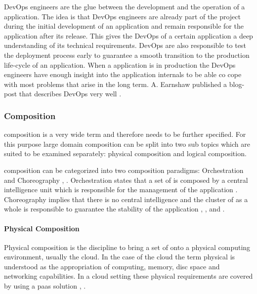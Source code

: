 DevOps engineers are the glue between the development and the operation of a
\ms{} application. The idea is that DevOps engineers are already part of the
project during the initial development of an application and remain responsible
for the application after its release. This gives the DevOps of a certain
application a deep understanding of its technical requirements. DevOps are also
responsible to test the deployment process early to guarantee a smooth
transition to the production life-cycle of an application. When a \ms{}
application is in production the DevOps engineers have enough insight into the
application internals to be able co cope with most problems that arise in the
long term. A. Earnshaw published a blog-post that describes DevOps very
well \cite{earnshaw2013devops}.

\subsubsection{\msuc{} Composition}
\label{subsub:composition}

\msuc{} composition is a very wide term and therefore needs to be further
specified. For this purpose large domain composition can be split into two sub
topics which are suited to be examined separately: physical composition and
logical composition.

\msuc{} composition can be categorized into two composition paradigms:
Orchestration and Choreography \cite{varjoinen2014orchestrationVSchoreography},
\cite{lublinsky2008orchestrationVSchoreography}. Orchestration states that a set
of \mss{} is composed by a central intelligence unit which is responsible for
the management of the application \cite{cohen2015orchestration}. Choreography
implies that there is no central intelligence and the cluster of \mss{} as a
whole is responsible to guarantee the stability of the application
\cite{millidge2015choreography}, \cite{vilas2016choreography}, and
\cite{jellema2017choreography}.

\paragraph{Physical Composition}

Physical composition is the discipline to bring a set of \mss{} onto a
physical computing environment, usually the cloud. In the case of the cloud the
term physical is understood as the appropriation of computing, memory, disc
space and networking capabilities. In a cloud setting these physical
requirements are covered by using a \gls{paas} solution
\cite{lawton2008developing}, \cite{buyya2009modeling}.

